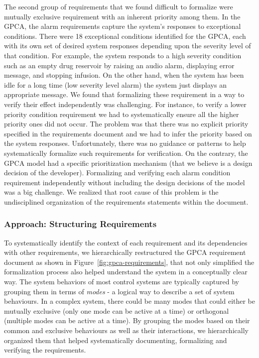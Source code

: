 The second group of requirements that we found difficult to formalize were mutually exclusive requirement with an inherent priority among them. In the GPCA, the alarm requirements capture the system's responses to exceptional conditions. There were 18 exceptional conditions identified for the GPCA, each with its own set of desired system responses depending upon the severity level of that condition. For example, the system responds to a high severity condition such as an empty drug reservoir by raising an audio alarm, displaying error message, and stopping infusion. On the other hand, when the system has been idle for a long time (low severity level alarm) the system just displays an appropriate message. We found that formalizing these requirement in a way to verify their effect independently was challenging. For instance, to verify a lower priority condition requirement we had to systematically ensure all the higher priority ones did not occur. The problem was that there was no explicit priority specified in the requirements document and we had to infer the priority based on the system responses. Unfortunately, there was no guidance or patterns to help systematically formalize such requirements for verification. On the contrary, the GPCA model had a specific prioritization mechanism (that we believe is a design decision of the developer). Formalizing and verifying each alarm condition requirement independently without including the design decisions of the model was a big challenge. We realized that root cause of this problem is the undisciplined organization of the requirements statements within the document.
\vspace{-0.1in}
\subsubsection {Approach: Structuring Requirements}

To systematically identify the context of each requirement and its dependencies with other requirements, we hierarchically restructured the GPCA requirement document as shown in Figure~\ref{fig:gpca-requirements}, that not only simplified the formalization process also helped understand the system in a conceptually clear way. The system behaviors of most control systems are typically captured by grouping them in terms of \emph{modes} - a logical way to describe a set of system behaviours. In a complex system, there could be many modes that could either be mutually exclusive (only one mode can be active at a time) or orthogonal (multiple modes can be active at a time). By grouping the modes based on their common and exclusive behaviours as well as their interactions, we hierarchically organized them that helped systematically documenting, formalizing and verifying the requirements.

